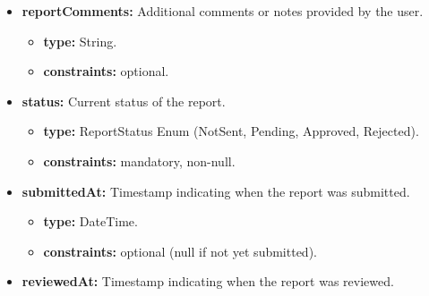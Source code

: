 \begin{itemize} [leftmargin=0.75cm, noitemsep, label=\textbullet]
    \begin{itemize} [leftmargin=0.75cm, noitemsep, label=$\circ$]

        \item \textbf{type:} DateTime.

        \item \textbf{constraints:} mandatory, non-null.

    \end{itemize}

    \item \textbf{reportComments:} Additional comments or notes provided by the user.
    
    \begin{itemize} [leftmargin=0.75cm, noitemsep, label=$\circ$]

        \item \textbf{type:} String.

        \item \textbf{constraints:} optional.

    \end{itemize}

    \item \textbf{status:} Current status of the report.
    
    \begin{itemize} [leftmargin=0.75cm, noitemsep, label=$\circ$]

        \item \textbf{type:} ReportStatus Enum (NotSent, Pending, Approved, Rejected).

        \item \textbf{constraints:} mandatory, non-null.

    \end{itemize}

    \item \textbf{submittedAt:} Timestamp indicating when the report was submitted.
    
    \begin{itemize} [leftmargin=0.75cm, noitemsep, label=$\circ$]

        \item \textbf{type:} DateTime.

        \item \textbf{constraints:} optional (null if not yet submitted).

    \end{itemize}

    \item \textbf{reviewedAt:} Timestamp indicating when the report was reviewed.
    

\end{itemize}
